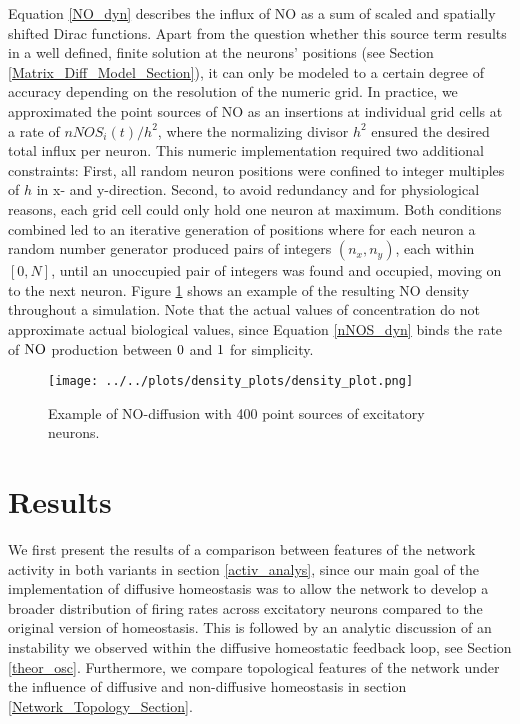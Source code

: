 \documentclass[10pt,a4paper]{article}
\begin{document}
Equation \eqref{NO_dyn} describes the influx of NO as a sum of scaled and spatially shifted Dirac functions. Apart from the question whether this source term results in a well defined, finite solution at the neurons' positions (see Section \ref{Matrix_Diff_Model_Section}), it can only be modeled to a certain degree of accuracy depending on the resolution of the numeric grid. In practice, we approximated the point sources of NO as an insertions at individual grid cells at a rate of $nNOS_i(t) / h^2$, where the normalizing divisor $h^2$ ensured the desired total influx per neuron. This numeric implementation required two additional constraints: First, all random neuron positions were confined to integer multiples of $h$ in x- and y-direction. Second, to avoid redundancy and for physiological reasons, each grid cell could only hold one neuron at maximum. Both conditions combined led to an iterative generation of positions where for each neuron a random number generator produced pairs of integers $(n_x,n_y)$, each within $[0,N]$, until an unoccupied pair of integers was found and occupied, moving on to the next neuron. Figure \ref{diff_test_plot} shows an example of the resulting NO density throughout a simulation. Note that the actual values of concentration do not approximate actual biological values, since Equation \eqref{nNOS_dyn} binds the rate of $\rm NO$ production between $\rm 0$ and $\rm 1$ for simplicity.
\begin{figure}[h!]
\begin{center}
\texttt{[image: ../../plots/density\_plots/density\_plot.png]}
\end{center}
\caption{Example of NO-diffusion with 400 point sources of excitatory neurons.}
\label{diff_test_plot}
\end{figure}

\newpage
\section{Results} \label{results}
We first present the results of a comparison between features of the network activity in both variants in section \ref{activ_analys}, since our main goal of the implementation of diffusive homeostasis was to allow the network to develop a broader distribution of firing rates across excitatory neurons compared to the original version of homeostasis. This is followed by an analytic discussion of an instability we observed within the diffusive homeostatic feedback loop, see Section \ref{theor_osc}. Furthermore, we compare topological features of the network under the influence of diffusive and non-diffusive homeostasis in section \ref{Network_Topology_Section}. 
\end{document}
